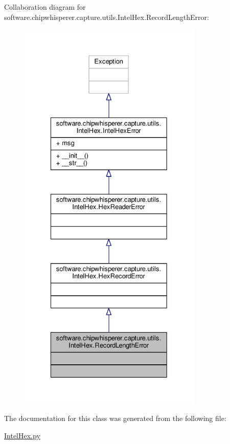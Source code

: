 Collaboration diagram for software.\+chipwhisperer.\+capture.\+utils.\+Intel\+Hex.\+Record\+Length\+Error\+:\nopagebreak
\begin{figure}[H]
\begin{center}
\leavevmode
\includegraphics[height=550pt]{d5/d17/classsoftware_1_1chipwhisperer_1_1capture_1_1utils_1_1IntelHex_1_1RecordLengthError__coll__graph}
\end{center}
\end{figure}


The documentation for this class was generated from the following file\+:\begin{DoxyCompactItemize}
\item 
\hyperlink{IntelHex_8py}{Intel\+Hex.\+py}\end{DoxyCompactItemize}
